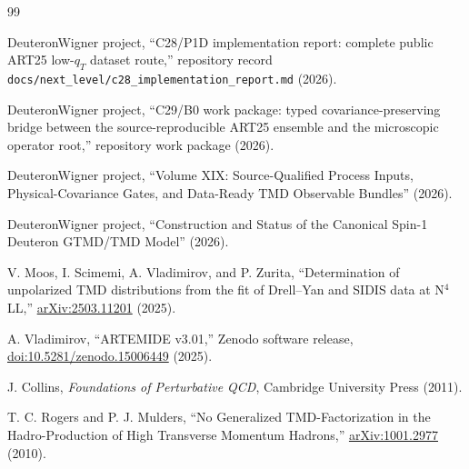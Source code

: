 \documentclass[11pt]{article}
\begin{document}
\begin{thebibliography}{99}

DeuteronWigner project,
``C28/P1D implementation report: complete public ART25 low-\(q_T\) dataset route,''
repository record \texttt{docs/next\_level/c28\_implementation\_report.md} (2026).

DeuteronWigner project,
``C29/B0 work package: typed covariance-preserving bridge between the source-reproducible ART25 ensemble and the microscopic operator root,''
repository work package (2026).

DeuteronWigner project,
``Volume XIX: Source-Qualified Process Inputs, Physical-Covariance Gates, and Data-Ready TMD Observable Bundles'' (2026).

DeuteronWigner project,
``Construction and Status of the Canonical Spin-1 Deuteron GTMD/TMD Model'' (2026).

V. Moos, I. Scimemi, A. Vladimirov, and P. Zurita,
``Determination of unpolarized TMD distributions from the fit of Drell--Yan and SIDIS data at N\(^4\)LL,''
\href{https://arxiv.org/abs/2503.11201}{arXiv:2503.11201} (2025).

A. Vladimirov,
``ARTEMIDE v3.01,'' Zenodo software release,
\href{https://doi.org/10.5281/zenodo.15006449}{doi:10.5281/zenodo.15006449} (2025).

J. Collins,
\emph{Foundations of Perturbative QCD}, Cambridge University Press (2011).

T. C. Rogers and P. J. Mulders,
``No Generalized TMD-Factorization in the Hadro-Production of High Transverse Momentum Hadrons,''
\href{https://arxiv.org/abs/1001.2977}{arXiv:1001.2977} (2010).

\end{thebibliography}
\end{document}

